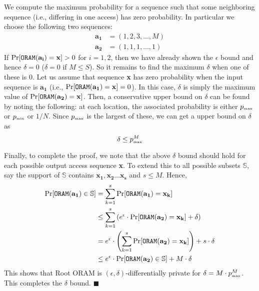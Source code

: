 \documentclass[USenglish,oneside,twocolumn]{article}
\newcommand{\ourprotocol}{Root ORAM}
\begin{document}
We compute the maximum probability for a sequence such that some neighboring sequence (i.e., differing in one access) has zero probability. In particular we choose the following two sequences:
\begin{align*}
\mathbf{a_1} &= (1,2,3, . . . ,M) \\
\mathbf{a_2} &= (1,1,1, . . . , 1)
\end{align*}
If $\Pr [{\tt ORAM}(\mathbf{a_i}) = \mathbf{x}] > 0$ for $i = 1,2$, then we have already shown the $\epsilon$ bound and hence $\delta = 0$ ($\delta=0$ if $M \leq S$). So it remains to find the maximum $\delta$ when one of these is $0$. Let us assume that sequence \textbf{x} has zero probability when the input sequence is $\mathbf{a_1}$ (i.e., $\Pr [{\tt ORAM}(\mathbf{a_1}) = \mathbf{x}] = 0$). In this case, $\delta$ is simply the maximum value of $\Pr [{\tt ORAM}(\mathbf{a_2}) = \mathbf{x}]$. Then, a conservative upper bound on $\delta$ can be found by noting the following: at each location, the associated probability is either $p_{{\tiny \mbox{max}}}$ or $p_{{\tiny \mbox{min}}}$ or $1/N$. Since $p_{{\tiny \mbox{max}}}$ is the largest of these, we can get a upper bound on $\delta$ as
\begin{equation}
\delta \leq p_{{\tiny \mbox{max}}}^{M}
\end{equation}

Finally, to complete the proof, we note that the above $\delta$ bound should hold for each possible output access sequence \textbf{x}. To extend this to all possible subsets $\mathbb{S}$, say the support of $\mathbb{S}$ contains $\mathbf{x_1, x_2 \hdots x_s}$ and $s \leq M$. Hence,  
\begin{align*}
\Pr [{\tt ORAM}(\mathbf{a_1}) \in \mathbb{S}] &= \sum\limits_{k=1}^s \Pr [{\tt ORAM}(\mathbf{a_1}) = \mathbf{x_k}] \\
&\leq \sum\limits_{k=1}^s \left( e^{\epsilon} \cdot \Pr [{\tt ORAM}(\mathbf{a_2}) = \mathbf{x_k}] + \delta \right) \\
&= e^{\epsilon} \cdot \left( \sum\limits_{k=1}^s \Pr [{\tt ORAM}(\mathbf{a_2}) = \mathbf{x_k}]  \right) + s \cdot \delta \\
&\leq e^{\epsilon} \cdot \Pr [{\tt ORAM}(\mathbf{a_2}) \in \mathbb{S}] + M \cdot \delta
\end{align*}
This shows that \ourprotocol{} is $(\epsilon, \delta)$-differentially private for $\delta = M \cdot p_{{\tiny \mbox{max}}}^{M}$. This completes the $\delta$ bound.  $\blacksquare$
\end{document}
